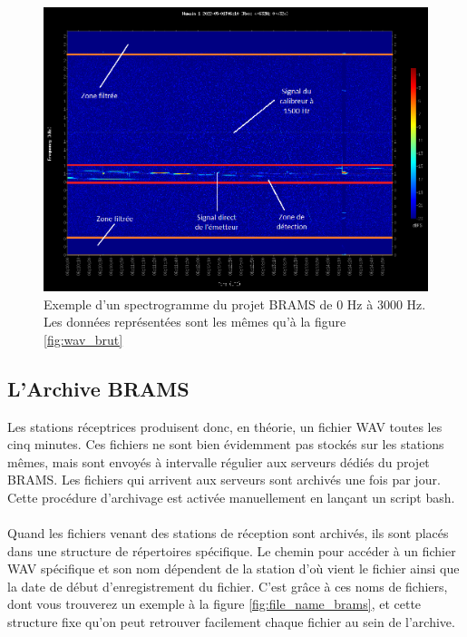 \documentclass[11pt]{article}
\begin{document}
\begin{figure}[h]
    \begin{center}
        \includegraphics[scale=0.81]{RAD_BEDOUR_20220501_0610_BEHUMA_SYS001.png}
        \caption{Exemple d'un spectrogramme du projet BRAMS de 0 Hz à 3000 Hz. Les données représentées sont les mêmes qu'à la figure \ref{fig:wav_brut}}
        \label{fig:spectro_brams-b}
    \end{center}
\end{figure}

\subsection{L'Archive BRAMS}

Les stations réceptrices produisent donc, en théorie, un fichier WAV toutes les cinq minutes.
Ces fichiers ne sont bien évidemment pas stockés sur les stations mêmes, mais sont envoyés à intervalle régulier aux serveurs dédiés du projet BRAMS.
Les fichiers qui arrivent aux serveurs sont archivés une fois par jour.
Cette procédure d'archivage est activée manuellement en lançant un script bash.\\
\\
Quand les fichiers venant des stations de réception sont archivés, ils sont placés dans une structure de répertoires spécifique.
Le chemin pour accéder à un fichier WAV spécifique et son nom dépendent de la station d'où vient le fichier ainsi que la date de début d'enregistrement du fichier.
C'est grâce à ces noms de fichiers, dont vous trouverez un exemple à la figure \ref{fig:file_name_brams}, et cette structure fixe qu'on peut retrouver facilement chaque fichier au sein de l'archive.\\
\end{document}
